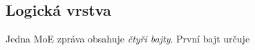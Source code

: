 \subsection{Logická vrstva}

Jedna \acs{MoE} zpráva obsahuje \emph{čtyři bajty}. První bajt určuje 





